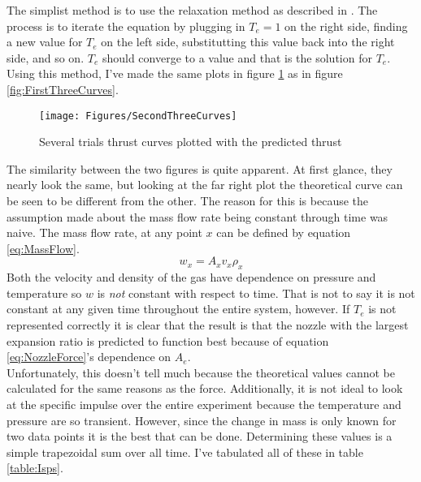 The simplist method is to use the relaxation method as described in \cite{newman}. The process is to iterate the equation by plugging in $T_e=1$ on the right side, finding a new value for $T_e$ on the left side, substitutting this value back into the right side, and so on. $T_e$ should converge to a value and that is the solution for $T_e$. Using this method, I've made the same plots in figure \ref{fig:SecondThreeCurves} as in figure \ref{fig:FirstThreeCurves}.
\begin{figure}[h!]
\centering
\texttt{[image: Figures/SecondThreeCurves]}
\caption{Several trials thrust curves plotted with the predicted thrust}
\label{fig:SecondThreeCurves}
\end{figure}
The similarity between the two figures is quite apparent. At first glance, they nearly look the same, but looking at the far right plot the theoretical curve can be seen to be different from the other. The reason for this is because the assumption made about the mass flow rate being constant through time was naive. The mass flow rate, at any point $x$  can be defined by equation \ref{eq:MassFlow}.
\begin{equation}\label{eq:MassFlow}
w_x=A_x v_x \rho_x
\end{equation}%
%
Both the velocity and density of the gas have dependence on pressure and temperature so $w$ is \textit{not} constant with respect to time. That is not to say it is not constant at any given time throughout the entire system, however. If $T_e$ is not represented correctly it is clear that the result is that the nozzle with the largest expansion ratio is predicted to function best because of equation \ref{eq:NozzleForce}'s dependence on $A_e$. \\
Unfortunately, this doesn't tell much because the theoretical values cannot be calculated for the same reasons as the force. Additionally, it is not ideal to look at the specific impulse over the entire experiment because the temperature and pressure are so transient. However, since the change in mass is only known for two data points it is the best that can be done. Determining these values is a simple trapezoidal sum over all time. I've tabulated all of these in table \ref{table:Isps}.
